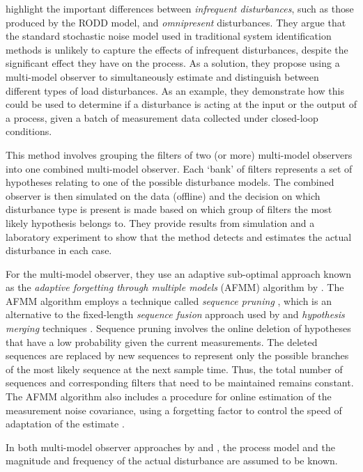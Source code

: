 \cite{eriksson_classification_1996} highlight the important differences between \textit{infrequent disturbances}, such as those produced by the RODD model, and \textit{omnipresent} disturbances. They argue that the standard stochastic noise model used in traditional system identification methods is unlikely to capture the effects of infrequent disturbances, despite the significant effect they have on the process. As a solution, they propose using a multi-model observer to simultaneously estimate and distinguish between different types of load disturbances. As an example, they demonstrate how this could be used to determine if a disturbance is acting at the input or the output of a process, given a batch of measurement data collected under closed-loop conditions.

This method involves grouping the filters of two (or more) multi-model observers into one combined multi-model observer. Each `bank' of filters represents a set of hypotheses relating to one of the possible disturbance models. The combined observer is then simulated on the data (offline) and the decision on which disturbance type is present is made based on which group of filters the most likely hypothesis belongs to. They provide results from simulation and a laboratory experiment to show that the method detects and estimates the actual disturbance in each case.

For the multi-model observer, they use an adaptive sub-optimal approach known as the \textit{adaptive forgetting through multiple models} (AFMM) algorithm by \cite{andersson_adaptive_1985}. The AFMM algorithm employs a technique called \textit{sequence pruning} \citep{tugnait_detection_1982}, which is an alternative to the fixed-length \textit{sequence fusion} approach used by \cite{robertson_detection_1995} and \textit{hypothesis merging} techniques \citep{blom_interacting_1988}. Sequence pruning involves the online deletion of hypotheses that have a low probability given the current measurements. The deleted sequences are replaced by new sequences to represent only the possible branches of the most likely sequence at the next sample time. Thus, the total number of sequences and corresponding filters that need to be maintained remains constant. The AFMM algorithm also includes a procedure for online estimation of the measurement noise covariance, using a forgetting factor to control the speed of adaptation of the estimate \citep{andersson_adaptive_1985}.

In both multi-model observer approaches by \cite{eriksson_classification_1996} and \cite{robertson_detection_1995}, the process model and the magnitude and frequency of the actual disturbance are assumed to be known.

